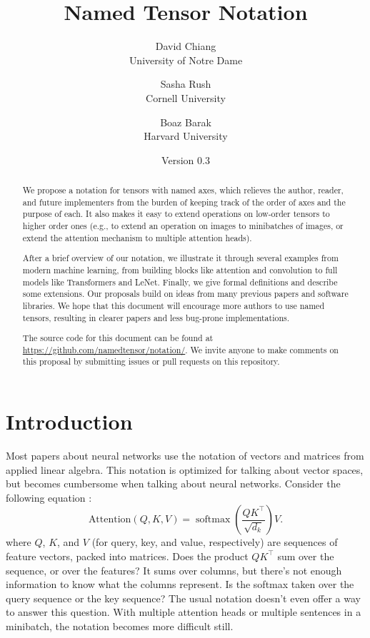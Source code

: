 \documentclass{article}
\title{\bf Named Tensor Notation}
\author{David Chiang \\ \small University of Notre Dame \and Sasha Rush \\ \small Cornell University \and Boaz Barak \\ \small Harvard University}
\date{Version 0.3}
\DeclareMathOperator*{\softmax}{softmax}
\begin{document}
\maketitle

\begin{abstract}
We propose a notation for tensors with named axes, which relieves the author, reader, and future implementers from the burden of keeping track of the order of axes and the purpose of each. It also makes it easy to extend operations on low-order tensors to higher order ones (e.g., to extend an operation on images to minibatches of images, or extend the attention mechanism to multiple attention heads).

After a brief overview of our notation, we illustrate it through several examples from modern machine learning, from building blocks like attention and convolution to full models like Transformers and LeNet. Finally, we give formal definitions and describe some extensions. Our proposals build on ideas from many previous papers and software libraries. We hope that this document will encourage more authors to use named tensors, resulting in clearer papers and less bug-prone implementations.

The source code for this document can be found at \url{https://github.com/namedtensor/notation/}. We invite anyone to make comments on this proposal by submitting issues or pull requests on this repository.
\end{abstract}

\setcounter{tocdepth}{1}
\tableofcontents

\clearpage

\section{Introduction}
\label{sec:intro}

Most papers about neural networks use the notation of vectors and matrices from applied linear algebra. This notation is optimized for talking about vector spaces, but becomes cumbersome when talking about neural networks. Consider the following equation \citep{vaswani+:2017}:
\[ \text{Attention}(Q, K, V) = \softmax \left( \frac{QK^\top}{\sqrt{d_k}} \right) V. \]
where $Q$, $K$, and $V$ (for query, key, and value, respectively) are sequences of feature vectors, packed into matrices. Does the product $QK^\top$ sum over the sequence, or over the features? It sums over columns, but there's not enough information to know what the columns represent. Is the softmax taken over the query sequence or the key sequence? The usual notation doesn't even offer a way to answer this question. With multiple attention heads or multiple sentences in a minibatch, the notation becomes more difficult still.
\end{document}

